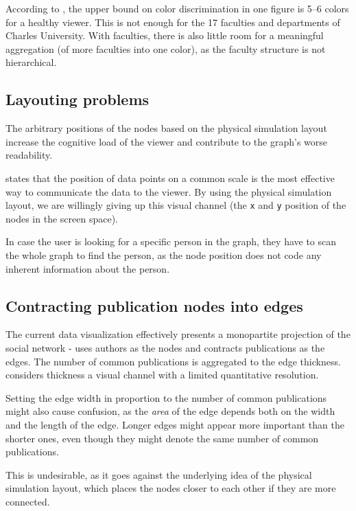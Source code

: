 According to \cite{Cleveland1985}, the upper bound on color discrimination in one figure is 5–6 colors for a healthy viewer. 
This is not enough for the 17 faculties and departments of Charles University. 
With faculties, there is also little room for a meaningful aggregation (of more faculties into one color), as the faculty structure is not hierarchical.

\subsection{Layouting problems} \label{sec:layouting-problems}

The arbitrary positions of the nodes based on the physical simulation layout increase the cognitive load 
of the viewer and contribute to the graph's worse readability.

\cite{munzner2015visualization} states that the position of data points on a common scale is the most effective way to communicate the data to the viewer.
By using the physical simulation layout, we are willingly giving up this visual channel (the \texttt{x} and \texttt{y} position of the nodes in the screen space).

In case the user is looking for a specific person in the graph, they have to scan the whole graph to find the person, as the node position does not code any inherent information about the person.

\subsection{Contracting publication nodes into edges}

The current data visualization effectively presents a monopartite projection of the social network - uses authors as the nodes and contracts publications as the edges.
The number of common publications is aggregated to the edge thickness. \cite{10.5555/2385879} considers thickness a visual channel with a limited quantitative resolution.

Setting the edge width in proportion to the number of common publications might also cause confusion, as the \textit{area} of the edge depends both on the width and the length of the edge.
Longer edges might appear more important than the shorter ones, even though they might denote the same number of common publications.

This is undesirable, as it goes against the underlying idea of the physical simulation layout, which places the nodes closer to each other if they are more connected.

